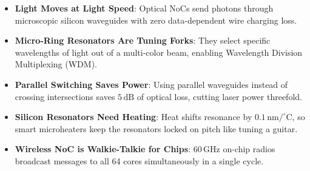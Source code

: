 \begin{itemize}
    \item \textbf{Light Moves at Light Speed}: Optical NoCs send photons through microscopic silicon waveguides with zero data-dependent wire charging loss.
    \item \textbf{Micro-Ring Resonators Are Tuning Forks}: They select specific wavelengths of light out of a multi-color beam, enabling Wavelength Division Multiplexing (WDM).
    \item \textbf{Parallel Switching Saves Power}: Using parallel waveguides instead of crossing intersections saves $5\,\mathrm{dB}$ of optical loss, cutting laser power threefold.
    \item \textbf{Silicon Resonators Need Heating}: Heat shifts resonance by $0.1\,\mathrm{nm/^\circ C}$, so smart microheaters keep the resonators locked on pitch like tuning a guitar.
    \item \textbf{Wireless NoC is Walkie-Talkie for Chips}: 60\,GHz on-chip radios broadcast messages to all 64 cores simultaneously in a single cycle.
\end{itemize}


